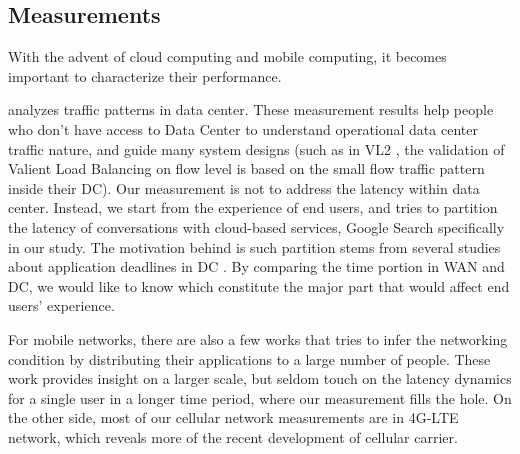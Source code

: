 \subsection{Measurements}
\label{sec:measurements}

With the advent of cloud computing and mobile computing, it becomes important to characterize their performance. 

\cite{benson2010network, kandula2009nature} analyzes traffic patterns in data center. These measurement results help people who don't have access to Data Center to understand operational data center traffic nature, and guide many system designs (such as in VL2 \cite{greenberg2009vl2}, the validation of Valient Load Balancing on flow level is based on the small flow traffic pattern inside their DC). Our measurement is not to address the latency within data center. Instead, we start from the experience of end users, and tries to partition the latency of conversations with cloud-based services, Google Search specifically in our study. The motivation behind is such partition stems from several studies about application deadlines in DC \cite{wilson2011better}. By comparing the time portion in WAN and DC, we would like to know which constitute the major part that would affect end users' experience.

For mobile networks, there are also a few works \cite{xu2011cellular, huang2011mobiperf} that tries to infer the networking condition by distributing their applications to a large number of people. These work provides insight on a larger scale, but seldom touch on the latency dynamics for a single user in a longer time period, where our measurement fills the hole. On the other side, most of our cellular network measurements are in 4G-LTE network, which reveals more of the recent development of cellular carrier.




